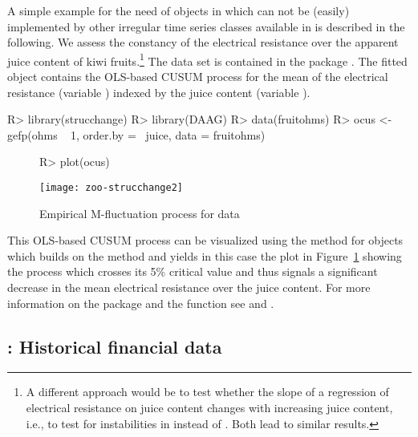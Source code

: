 \documentclass{Z}
\begin{document}
A simple example for the need of  objects in 
which can not be (easily) implemented by other irregular time series classes
available in  is described in the following. We assess the constancy of the
electrical resistance over the apparent juice content of kiwi fruits.\footnote{A different
approach would be to test whether the slope of a regression of electrical resistance
on juice content changes with increasing juice content, i.e., to test for
instabilities in  instead of . Both lead to 
similar results.} The data
set  is contained in the  package \citep{zoo:DAAG:2004}.
The fitted  object contains the OLS-based CUSUM process for the mean
of the electrical resistance (variable ) indexed by the juice
content (variable ).

\begin{Schunk}
\begin{Sinput}
R> library(strucchange)
R> library(DAAG)
R> data(fruitohms)
R> ocus <- gefp(ohms ~ 1, order.by = ~juice, data = fruitohms)
\end{Sinput}
\end{Schunk}

\begin{figure}[h!]
\begin{center}
\begin{Schunk}
\begin{Sinput}
R> plot(ocus)
\end{Sinput}
\end{Schunk}
\texttt{[image: zoo-strucchange2]}
\caption{\label{fig:strucchange} Empirical M-fluctuation process for  data}
\end{center}
\end{figure}

This OLS-based CUSUM process can be visualized using the  method
for  objects which builds on the  method and yields in
this case the plot in Figure~\ref{fig:strucchange} showing the process which
crosses its 5\% critical value and 
thus signals a significant decrease in the mean electrical resistance over the
juice content. For more information on the package  and the 
function  see \cite{zoo:Zeileis+Leisch+Hornik:2002} and 
\cite{zoo:Zeileis:2004}.


\subsection[tseries: Historical financial data]{: Historical financial data}
\label{sec:tseries}
\end{document}
